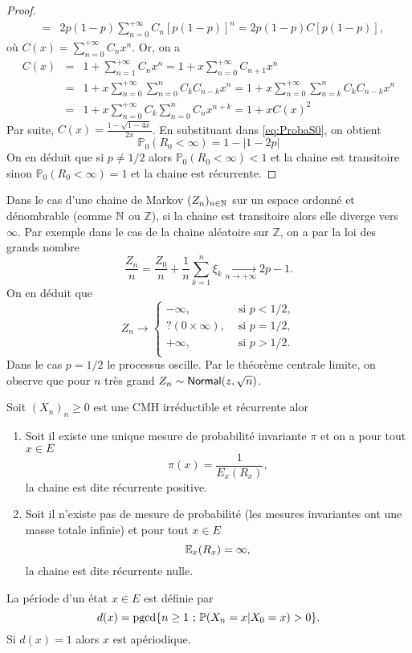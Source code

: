 \begin{proof}
\begin{eqnarray}
&=&2p(1-p)\sum_{n=0}^{+\infty}C_{n}[p(1-p)]^{n}=2p(1-p)C[p(1-p)],\label{eq:ProbaS0}
\end{eqnarray}
où $C(x)=\sum_{n=0}^{+\infty}C_nx^{n}$. Or, on a
\begin{eqnarray*}
C(x)&=&1+\sum_{n=1}^{+\infty}C_nx^{n}=1+x\sum_{n=0}^{+\infty}C_{n+1}x^{n}\\
&=&1+x\sum_{n=0}^{+\infty}\sum_{n=0}^{n}C_kC_{n-k}x^{n}=1+x\sum_{n=0}^{+\infty}\sum_{n=k}^{n}C_kC_{n-k}x^{n}\\
&=&1+x\sum_{n=0}^{+\infty}C_k\sum_{n=0}^{n}C_{n}x^{n+k}=1+xC(x)^{2}
\end{eqnarray*}
Par suite, $C(x)=\frac{1-\sqrt{1-4x}}{2x}$. En substituant dans \eqref{eq:ProbaS0}, on obtient
$$
\mathbb{P}_0(R_0<\infty)=1-|1-2p|
$$
On en déduit que si $p\neq 1/2$ alors $\mathbb{P}_0(R_0<\infty)<1$ et la chaine est transitoire sinon $\mathbb{P}_0(R_0<\infty)=1$ et la chaine est récurrente.
\end{proof}
\begin{remark}
Dans le cas d'une chaine de Markov $(Z_n)_{n\in\mathbb{N}}$ sur un espace ordonné et dénombrable (comme $\mathbb{N}$ ou $\mathbb{Z}$), si la chaine est transitoire alors elle diverge vers $\infty$. Par exemple dans le cas de la chaine aléatoire sur $\mathbb{Z}$, on a par la loi des grands nombre
$$
\frac{Z_n}{n}=\frac{Z_0}{n}+\frac{1}{n}\sum_{k=1}^{n}\xi_k\underset{n\rightarrow+\infty}{\longrightarrow} 2p-1.
$$
On en déduit que
$$
Z_n\rightarrow\begin{cases}
-\infty,&\text{ si }p<1/2,\\
? (0\times \infty),&\text{ si }p=1/2,\\
+\infty,&\text{ si }p>1/2.\\
\end{cases}
$$
Dans le cas $p=1/2$ le processus oscille. Par le théorème centrale limite, on observe que pour $n$ très grand $Z_n\sim\mathsf{Normal}(z, \sqrt{n})$.
\end{remark}
\begin{theo}\label{theo:loi_invariante_existence_unicite}
Soit $(X_n)_n\geq 0$ est une CMH irréductible et récurrente alor
\begin{enumerate}
    \item Soit il existe une unique mesure de probabilité invariante $\pi$ et on a pour tout $x\in E$
    $$
    \pi(x) = \frac{1}{E_x(R_x)},
    $$
    la chaine est dite récurrente positive.
    \item Soit il n'existe pas de mesure de probabilité (les mesures invariantes ont une masse totale infinie) et pour tout $x\in E$
    $$
    \mathbb{E}_x(R_x) = \infty,
    $$
    la chaine est dite récurrente nulle. 
\end{enumerate}
\end{theo}
\begin{definition}
La période d'un état $x\in E$ est définie par 
$$
d(x) = \text{pgcd}\{n\geq 1\text{ ; }\mathbb{P}(X_n=x|X_0 = x)>0\}.
$$
Si $d(x) = 1$ alors $x$ est apériodique.
\end{definition}

